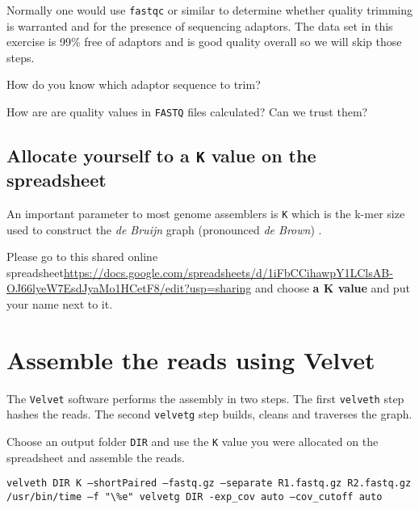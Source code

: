 Normally one would use \texttt{fastqc} or similar to determine whether quality trimming is warranted and for the presence of sequencing adaptors. 
The data set in this exercise is 99\% free of adaptors and is good quality overall so we will skip those steps.
\begin{questions}
How do you know which adaptor sequence to trim?
\begin{answer}
\end{answer}
How are are quality values in \texttt{FASTQ} files calculated? Can we trust them?
\begin{answer}
\end{answer}
\end{questions}

\subsection{Allocate yourself to a \texttt{K} value on the spreadsheet}

An important parameter to most genome assemblers is \texttt{K} which is the k-mer size used to construct the \textit{de Bruijn} graph (pronounced \textit{de Brown}) .

Please go to this shared online spreadsheet\url{https://docs.google.com/spreadsheets/d/1iFbCCihawpY1LClsAB-OJ66lyeW7EsdJyaMo1HCetF8/edit?usp=sharing} and choose \textbf{a K value} and put your name next to it.


\section{Assemble the reads using Velvet}
The \texttt{Velvet} software performs the assembly in two steps. The first \texttt{velveth} step hashes the reads. The second \texttt{velvetg} step builds, cleans and traverses the graph.

\begin{steps}
Choose an output folder \texttt{DIR} and use the \texttt{K} value you were allocated on the spreadsheet and assemble the reads.
\begin{lstlisting}
velveth DIR K –shortPaired –fastq.gz –separate R1.fastq.gz R2.fastq.gz 
/usr/bin/time –f "\%e" velvetg DIR -exp_cov auto –cov_cutoff auto
\end{lstlisting}
\end{steps}

